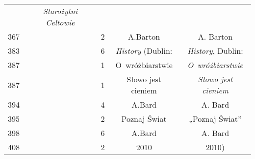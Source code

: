 \documentclass[a4paper,11pt]{article}
\begin{document}
\begin{center}
\begin{tabular}{|c|c|c|c|c|}
    & \textit{Starożytni Celtowie} \\
    367 & & \hphantom{0}2 & A.Barton & A. Barton \\
    383 & & \hphantom{0}6 & \textit{History} (Dublin:
    & \textit{History}, Dublin: \\
    387 & & \hphantom{0}1 & O~wróżbiarstwie & \textit{O~wróżbiarstwie} \\
    387 & & \hphantom{0}1 & Słowo jest cieniem
    & \textit{Słowo jest cieniem} \\
    394 & & \hphantom{0}4 & A.Bard & A. Bard \\
    395 & & \hphantom{0}2 & Poznaj Świat & „Poznaj Świat” \\
    398 & & \hphantom{0}6 & A.Bard & A. Bard \\
    408 & & \hphantom{0}2 & 2010 & 2010) \\
    \hline
  \end{tabular}





  \newpage


\end{center}
\end{document}

